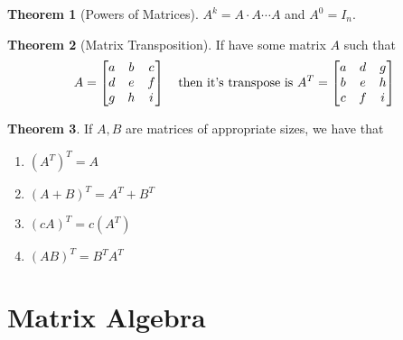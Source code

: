 \documentclass{article}
\numberwithin{equation}{section}
\theoremstyle{definition}
\newtheorem{thm}{Theorem}[subsection]
\theoremstyle{adefn}
\begin{document}
	\begin{thm}[Powers of Matrices]
		$A^k = A \cdot A \cdots A$ and $A^0 = I_n$.
	\end{thm}
	\begin{thm}[Matrix Transposition]
		If have some matrix $A$ such that 
		\begin{align*}
			A = \begin{bmatrix}
				a & b & c \\
				d & e & f \\
				g & h & i
			\end{bmatrix}\quad \hbox{then it's transpose is } A^T = \begin{bmatrix}
			a & d & g \\
			b & e & h \\
			c & f & i
			\end{bmatrix}
		\end{align*}
	\end{thm}
	\begin{thm}
		If $A, B$ are matrices of appropriate sizes, we have that
		\begin{enumerate}
			\item $(A^T)^T = A$
			\item $(A+B)^T = A^T + B^T$
			\item $(cA)^T = c(A^T)$
			\item $(AB)^T = B^TA^T$
		\end{enumerate}
	\end{thm}
	
	\section{Matrix Algebra}
	
\end{document}
